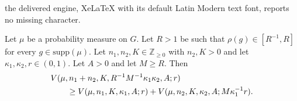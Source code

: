 \documentclass[10pt,a4paper]{amsart}
\begin{document}
the delivered engine, XeLaTeX with its default Latin Modern text font, reports no missing character.
\begin{proposition} \label{VarSumAdds}
    Let $\mu$ be a probability measure on $G$. Let $R > 1$ be such that $\rho(g) \in [R^{-1}, R]$ for every $g \in \mathrm{supp}(\mu)$. Let $n_1, n_2, K \in \mathbb{Z}_{\geq 0}$ with $n_2, K > 0$ and let $\kappa_1, \kappa_2, r \in (0, 1)$. Let $A > 0$ and let $M \geq R$. Then
    \begin{align*}
        \MoveEqLeft V(\mu,  n_1 + n_2, K, R^{-1} M^{-1} \kappa_1 \kappa_2, A; r) \\&\geq V(\mu, n_1, K, \kappa_1, A; r) + V(\mu,  n_2, K, \kappa_2, A; M \kappa_1^{-1} r).
    \end{align*} 
\end{proposition}
\end{document}
